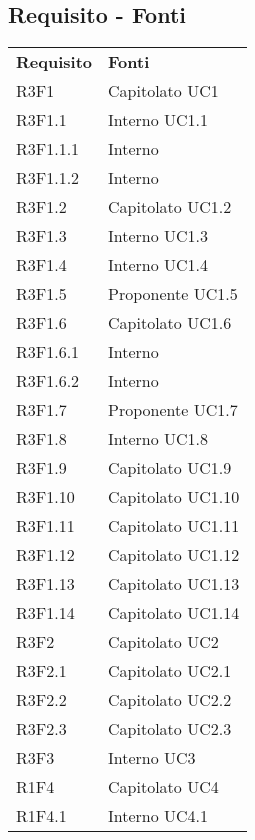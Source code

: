 	\subsection{Requisito - Fonti}
	\begin{longtable} {
			>{\centering}p{28mm}  
			>{}p{20mm}
		}
		\rowcolor{gray!50}
		\textbf{Requisito} & \textbf{Fonti}	\TBstrut \\
		R3F1 & Capitolato UC1 \TBstrut \\ [2mm]	
		R3F1.1 & Interno UC1.1 \TBstrut \\ [2mm]
		R3F1.1.1 & Interno \TBstrut \\ [2mm]
		R3F1.1.2 & Interno \TBstrut \\ [2mm]				
		R3F1.2 & Capitolato UC1.2 \TBstrut \\ [2mm]		
		R3F1.3 & Interno UC1.3 \TBstrut \\ [2mm]				
		R3F1.4 & Interno UC1.4 \TBstrut \\ [2mm]
		R3F1.5 & Proponente UC1.5 \TBstrut \\ [2mm]
		R3F1.6 & Capitolato UC1.6 \TBstrut \\ [2mm]
		R3F1.6.1 & Interno \TBstrut \\ [2mm]
		R3F1.6.2 & Interno \TBstrut \\ [2mm]
		R3F1.7 & Proponente UC1.7 \TBstrut \\ [2mm]
		R3F1.8 & Interno UC1.8 \TBstrut \\ [2mm]
		R3F1.9 & Capitolato UC1.9 \TBstrut \\ [2mm]
		R3F1.10 & Capitolato UC1.10 \TBstrut \\ [2mm]
		R3F1.11 & Capitolato UC1.11 \TBstrut \\ [2mm]
		R3F1.12 & Capitolato UC1.12 \TBstrut \\ [2mm]
		R3F1.13 & Capitolato UC1.13 \TBstrut \\ [2mm]
		R3F1.14 & Capitolato UC1.14 \TBstrut \\ [2mm]
		R3F2 & Capitolato UC2 \TBstrut \\ [2mm]
		R3F2.1 & Capitolato UC2.1 \TBstrut \\ [2mm]
		R3F2.2 & Capitolato UC2.2 \TBstrut \\ [2mm]
		R3F2.3 & Capitolato UC2.3 \TBstrut \\ [2mm]
		R3F3 & Interno UC3 \TBstrut \\ [2mm]		
		R1F4 & Capitolato UC4 \TBstrut \\ [2mm]	
		R1F4.1 & Interno UC4.1 \TBstrut \\ [2mm]		

\end{longtable}
